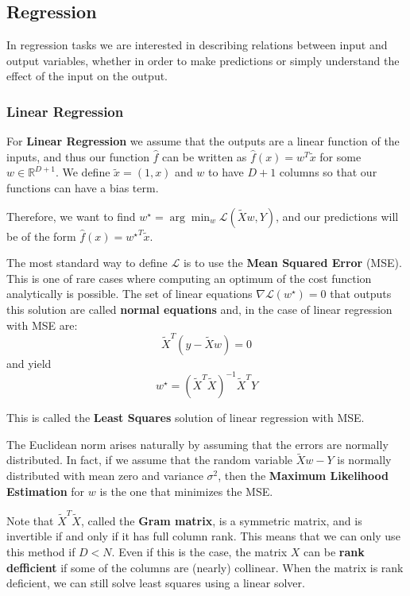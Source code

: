 \documentclass{article}
\newcommand{\R}{\mathbb{R}}
\newcommand{\loss}{\mathcal{L}}
\begin{document}
\subsection{Regression}

In regression tasks we are interested in describing relations between input and output variables, whether in order to make predictions or simply understand the effect of the input on the output.

\subsubsection{Linear Regression}

For \textbf{Linear Regression} we assume that the outputs are a linear function of the inputs, and thus our function $\hat{f}$ can be written as $\hat{f}(x) = w^T \tilde{x}$ for some $w \in \R^{D+1}$.
We define $\tilde{x} = (1, x)$ and $w$ to have $D+1$ columns so that our functions can have a bias term.

Therefore, we want to find $w^\star = \arg \min_w \loss(\tilde{X}w, Y)$, and our predictions will be of the form $\hat{f}(x) = {w^\star}^T \tilde{x}$.

The most standard way to define $\loss$ is to use the \textbf{Mean Squared Error} (MSE).
This is one of rare cases where computing an optimum of the cost function analytically is possible.
The set of linear equations $\nabla \loss(w^\star) = 0$ that outputs this solution are called \textbf{normal equations} and, in the case of linear regression with MSE are:
$$
\tilde{X}^T (y - \tilde{X}w) = 0
$$
and yield
$$
w^\star = (\tilde{X}^T \tilde{X})^{-1} \tilde{X}^T Y
$$

This is called the \textbf{Least Squares} solution of linear regression with MSE.

The Euclidean norm arises naturally by assuming that the errors are normally distributed.
In fact, if we assume that the random variable $\tilde{X}w - Y$ is normally distributed with mean zero and variance $\sigma^2$, then the \textbf{Maximum Likelihood Estimation} for $w$ is the one that minimizes the MSE.

Note that $\tilde{X}^T \tilde{X}$, called the \textbf{Gram matrix}, is a symmetric matrix, and is invertible if and only if it has full column rank.
This means that we can only use this method if $D < N$.
Even if this is the case, the matrix $X$ can be \textbf{rank defficient} if some of the columns are (nearly) collinear.
When the matrix is rank deficient, we can still solve least squares using a linear solver.
\end{document}
